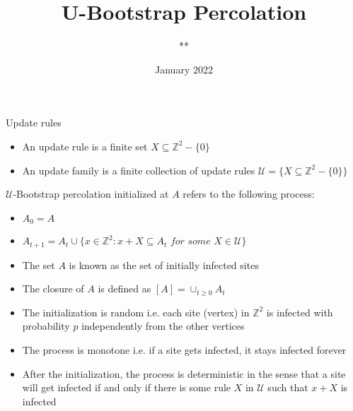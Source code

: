 \documentclass{beamer}
\title[$\mathscr{U}$-Bootstrap percolation] %
{U-Bootstrap Percolation}
\author[Pak, Davy, Gjorgjevski] %
{**}
\institute[ENS Lyon] %
{
  ENS Lyon \\
  M2 Advanced Mathematics}
\date[Short Occasion] %
{January 2022}
\begin{document}
\maketitle

\begin{frame}{Update rules}
    
    \begin{itemize}
        \item An update rule is a finite set $X\subseteq\mathbb{Z}^2-\{0\}$
        \item An update family is a finite collection of update rules $\mathscr{U}=\{X\subseteq\mathbb{Z}^2-\{0\}\}$
    \end{itemize}
    
 
\begin{block}{}
   
 $\mathscr{U}$-Bootstrap percolation initialized at $A$ refers to the following process:

 \begin{itemize}
     \item $A_0=A$
     \item $A_{t+1}=A_t\cup \{x\in\mathbb{Z}^2: x+X\subseteq A_t \textit{ for some } X\in\mathscr{U}\}$
 \end{itemize}
 \end{block}
 
 \end{frame}
 \begin{frame}

 \begin{itemize}
 
 
     \item The set $A$ is known as the set of initially infected sites
     \item The closure of $A$ is defined as $[A]=\cup_{t\geq 0} A_t$
     \item The initialization is random i.e. each site (vertex)
     in $\mathbb{Z}^2$ is infected with probability $p$ independently from the other vertices
     \item The process is monotone i.e. if a site gets infected, it stays infected forever
     \item After the initialization, the process is deterministic in the sense that a site will get infected if and only if there is some rule $X$ in $\mathscr{U}$ such that $x+X$ is infected
 \end{itemize}
 


\end{frame}
\end{document}
